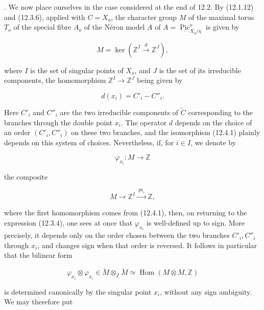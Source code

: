 \medskip
{}. We now place ourselves in the case considered at the end of 12.2.
By (12.1.12) and (12.3.6), applied with $C=X_o$, the character group
$M$ of the maximal torus $T_o$ of the special fibre $A_o$ of the
N\'eron model $A$ of
$A=\underline{\operatorname{Pic}}^o_{X_\eta/\eta}$ is given by

\begin{equation}\tag{12.4.1}
 M=\ker\left(\mathbb Z^I\xrightarrow{\ d\ }\mathbb Z^J\right),
\end{equation}

\noindent
where $I$ is the set of singular points of $X_o$, and $J$ is the set of
its irreducible components, the homomorphism
$\mathbb Z^I\to\mathbb Z^J$ being given by

\begin{equation}\tag{12.4.2}
 d(x_i)=C'_i-C''_i.
\end{equation}

Here $C'_i$ and $C''_i$ are the two irreducible components of
$\widetilde C$ corresponding to the branches through the double point
$x_i$. The operator $d$ depends on the choice of an order
$(C'_i,C''_i)$ on these two branches, and the isomorphism (12.4.1)
plainly depends on this system of choices. Nevertheless, if, for
$i\in I$, we denote by

\begin{equation}\tag{12.4.3}
 \varphi_{x_i}:M\longrightarrow\mathbb Z
\end{equation}

\noindent
the composite

\begin{equation*}
 M\longrightarrow\mathbb Z^I
   \xrightarrow{\ \operatorname{pr}_i\ }\mathbb Z,
\end{equation*}

\noindent
where the first homomorphism comes from (12.4.1), then, on returning to
the expression (12.3.4), one sees at once that $\varphi_{x_i}$ is
well-defined up to sign. More precisely, it depends only on the order
chosen between the two branches $C'_i,C''_i$ through $x_i$, and changes
sign when that order is reversed. It follows in particular that the
bilinear form

\begin{equation}\tag{12.4.4}
 \varphi_{x_i}\otimes\varphi_{x_i}
 \in \check M\otimes_{\mathbb Z}\check M
 \simeq\operatorname{Hom}(M\otimes M,\mathbb Z)
\end{equation}

\noindent
is determined canonically by the singular point $x_i$, without any sign
ambiguity. We may therefore put

